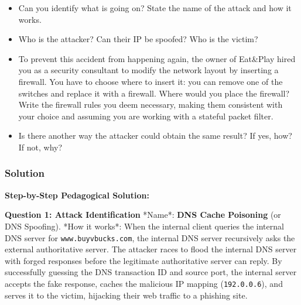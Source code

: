 \documentclass{article}
\begin{document}
\begin{itemize}
    \item[\textbf{1.}] [1 point] Can you identify what is going on? State the name of the attack and how it works.
    \item[\textbf{2.}] [1 point] Who is the attacker? Can their IP be spoofed? Who is the victim?
    \item[\textbf{3.}] [3 points] To prevent this accident from happening again, the owner of Eat\&Play hired you as a security consultant to modify the network layout by inserting a firewall. You have to choose where to insert it: you can remove one of the switches and replace it with a firewall. Where would you place the firewall? Write the firewall rules you deem necessary, making them consistent with your choice and assuming you are working with a stateful packet filter.
    \item[\textbf{4.}] [1 point] Is there another way the attacker could obtain the same result? If yes, how? If not, why?
\end{itemize}

\subsubsection*{Solution}
\textbf{Step-by-Step Pedagogical Solution:}

\textbf{Question 1: Attack Identification}
*Name*: \textbf{DNS Cache Poisoning} (or DNS Spoofing).
*How it works*: When the internal client queries the internal DNS server for \texttt{www.buyvbucks.com}, the internal DNS server recursively asks the external authoritative server. The attacker races to flood the internal DNS server with forged responses before the legitimate authoritative server can reply. By successfully guessing the DNS transaction ID and source port, the internal server accepts the fake response, caches the malicious IP mapping (\texttt{192.0.0.6}), and serves it to the victim, hijacking their web traffic to a phishing site.
\end{document}
